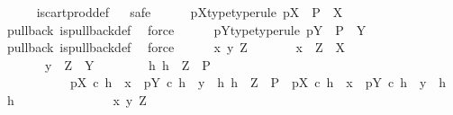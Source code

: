\begin{isabellebody}
\ \ \ \ \isamarkupfalse%
\ is{\isacharunderscore}{\kern0pt}cart{\isacharunderscore}{\kern0pt}prod{\isacharunderscore}{\kern0pt}def\isanewline
\ \ \isamarkupfalse%
{\isacharparenleft}{\kern0pt}safe{\isacharparenright}{\kern0pt}\isanewline
\ \ \ \ \isamarkupfalse%
\ pX{\isacharunderscore}{\kern0pt}type{\isacharbrackleft}{\kern0pt}type{\isacharunderscore}{\kern0pt}rule{\isacharbrackright}{\kern0pt}{\isacharcolon}{\kern0pt}\ {\isachardoublequoteopen}pX\ {\isacharcolon}{\kern0pt}\ P\ {\isasymrightarrow}\ X{\isachardoublequoteclose}\isanewline
\ \ \ \ \ \ \isamarkupfalse%
\ pullback\ is{\isacharunderscore}{\kern0pt}pullback{\isacharunderscore}{\kern0pt}def\ \isamarkupfalse%
\ force\isanewline
\ \ \ \ \isamarkupfalse%
\ pY{\isacharunderscore}{\kern0pt}type{\isacharbrackleft}{\kern0pt}type{\isacharunderscore}{\kern0pt}rule{\isacharbrackright}{\kern0pt}{\isacharcolon}{\kern0pt}\ {\isachardoublequoteopen}pY\ {\isacharcolon}{\kern0pt}\ P\ {\isasymrightarrow}\ Y{\isachardoublequoteclose}\isanewline
\ \ \ \ \ \ \isamarkupfalse%
\ pullback\ is{\isacharunderscore}{\kern0pt}pullback{\isacharunderscore}{\kern0pt}def\ \isamarkupfalse%
\ force\isanewline
\ \ \ \ \isamarkupfalse%
\ {\isachardoublequoteopen}{\isasymAnd}x\ y\ Z{\isachardot}{\kern0pt}\isanewline
\ \ \ \ \ \ \ x\ {\isacharcolon}{\kern0pt}\ Z\ {\isasymrightarrow}\ X\ {\isasymLongrightarrow}\isanewline
\ \ \ \ \ \ \ y\ {\isacharcolon}{\kern0pt}\ Z\ {\isasymrightarrow}\ Y\ {\isasymLongrightarrow}\isanewline
\ \ \ \ \ \ \ {\isasymexists}h{\isachardot}{\kern0pt}\ h\ {\isacharcolon}{\kern0pt}\ Z\ {\isasymrightarrow}\ P\ {\isasymand}\isanewline
\ \ \ \ \ \ \ \ \ \ \ pX\ {\isasymcirc}\isactrlsub c\ h\ {\isacharequal}{\kern0pt}\ x\ {\isasymand}\ pY\ {\isasymcirc}\isactrlsub c\ h\ {\isacharequal}{\kern0pt}\ y\ {\isasymand}\ {\isacharparenleft}{\kern0pt}{\isasymforall}h{}{\isachardot}{\kern0pt}\ h{}\ {\isacharcolon}{\kern0pt}\ Z\ {\isasymrightarrow}\ P\ {\isasymand}\ pX\ {\isasymcirc}\isactrlsub c\ h{}\ {\isacharequal}{\kern0pt}\ x\ {\isasymand}\ pY\ {\isasymcirc}\isactrlsub c\ h{}\ {\isacharequal}{\kern0pt}\ y\ {\isasymlongrightarrow}\ h{}\ {\isacharequal}{\kern0pt}\ h{\isacharparenright}{\kern0pt}{\isachardoublequoteclose}\isanewline
\ \ \ \ \isamarkupfalse%
\ {\isacharminus}{\kern0pt}\ \isanewline
\ \ \ \ \ \ \isamarkupfalse%
\ x\ y\ Z\isanewline
\ \ \ \ \ \ \isamarkupfalse%

\end{isabellebody}
